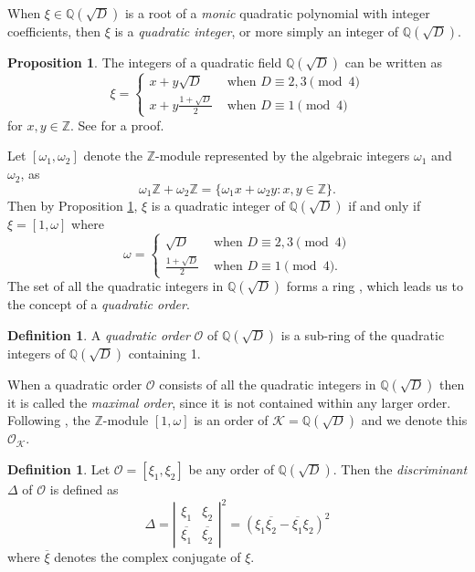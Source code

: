\documentclass{ucalgthes1}
\theoremstyle{definition}
\newtheorem{prop}[thm]{Proposition}
\newtheorem{defn}[thm]{Definition}
\newcommand{\ZZ}{\mathbb{Z}}
\newcommand{\QQ}{\mathbb{Q}}
\newcommand{\KK}{\mathcal{K}}
\newcommand{\OO}{\mathcal{O}}
\begin{document}
When $\xi \in \QQ(\sqrt D)$ is a root of a \emph{monic} quadratic polynomial with integer coefficients, then $\xi$ is a \emph{quadratic integer}, or more simply an integer of $\QQ(\sqrt D)$.

\begin{prop}
\label{prop:quadInts}
\cite[Proposition 13.1.1]{Ireland1990} The integers of a quadratic field $\QQ(\sqrt D)$ can be written as
\begin{equation*}
\xi = \begin{cases}
	x + y \sqrt D & \textrm{ when } D \equiv 2, 3 \pmod 4 \\
	x + y \frac{1 + \sqrt D}{2} & \textrm{ when } D \equiv 1 \pmod 4
	\end{cases}
\end{equation*}
for $x, y \in \ZZ$.  See \cite[p.189]{Ireland1990} for a proof.
\end{prop}

Let $[\omega_1, \omega_2]$ denote the $\ZZ$-module represented by the algebraic integers $\omega_1$ and $\omega_2$, as
\[
	\omega_1 \ZZ + \omega_2 \ZZ = \{ \omega_1 x + \omega_2 y : x, y \in \ZZ \}.
\]
Then by Proposition \ref{prop:quadInts}, $\xi$ is a quadratic integer of $\QQ(\sqrt D)$ if and only if $\xi = [1, \omega]$ where
\[
\omega = \begin{cases}
	\sqrt D & \textrm{ when } D \equiv 2,3 \pmod 4 \\
	\frac{1 + \sqrt D}{2} & \textrm{ when } D \equiv 1 \pmod 4.
\end{cases}
\]
The set of all the quadratic integers in $\QQ(\sqrt D)$ forms a ring \cite[p.47]{Cohn1980}, which leads us to the concept of a \emph{quadratic order}.

\begin{defn}
A \emph{quadratic order} $\OO$ of $\QQ(\sqrt D)$ is a sub-ring of the quadratic integers of $\QQ(\sqrt D)$ containing 1.
\end{defn}

When a quadratic order $\OO$ consists of all the quadratic integers in $\QQ(\sqrt D)$ then it is called the \emph{maximal order}, since it is not contained within any larger order.  Following \mbox{\cite[p.80]{Jacobson2009}}, the $\ZZ$-module $[1, \omega]$ is an order of $\KK = \QQ(\sqrt D)$ and we denote this $\OO_{\KK}$.

\begin{defn}
\cite[Definition 4.16]{Jacobson2009} Let $\OO = [\xi_1, \xi_2]$ be any order of $\QQ(\sqrt D)$.  Then the \emph{discriminant} $\Delta$ of $\OO$ is defined as
\[
	\Delta = {\left| \begin{array}{rr} \xi_1 & \xi_2 \\ \overline{\xi_1} & \overline{\xi_2} \end{array} \right|}^2
	       = (\xi_1 \overline{\xi_2} - \overline{\xi_1} \xi_2)^2
\]
where $\overline{\xi}$ denotes the complex conjugate of $\xi$.
\end{defn}
\end{document}
